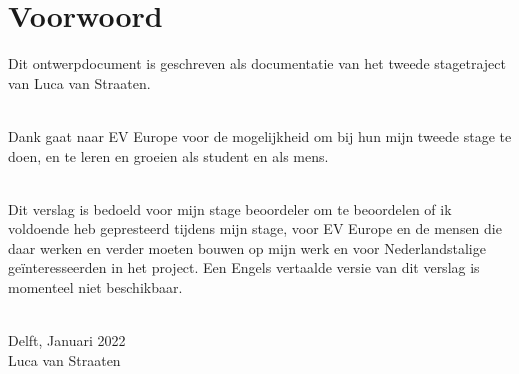 \chapter*{Voorwoord}

Dit ontwerpdocument is geschreven als documentatie van het tweede stagetraject
van Luca van Straaten.\\\

Dank gaat naar EV Europe voor de mogelijkheid om bij hun mijn tweede stage te
doen, en te leren en groeien als student en als mens.\\\

Dit verslag is bedoeld voor mijn stage beoordeler om te beoordelen of ik
voldoende heb gepresteerd tijdens mijn stage, voor EV Europe en de mensen die
daar werken en verder moeten bouwen op mijn werk en voor Nederlandstalige
geïnteresseerden in het project. Een Engels vertaalde versie van dit verslag is
momenteel niet beschikbaar.\\\

Delft, Januari 2022\\Luca van Straaten
